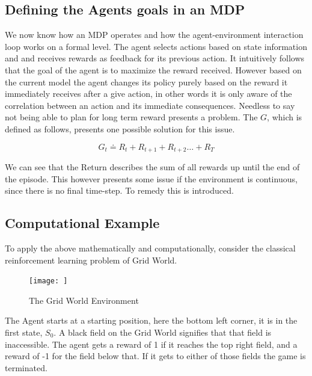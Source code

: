 \subsection{Defining the Agents goals in an MDP}\label{subsec:goals}

We now know how an MDP operates and how the agent-environment interaction loop works on a formal level. The agent selects actions based on state information and and receives rewards as feedback for its previous action. It intuitively follows that the goal of the agent is to maximize the reward received. However based on the current model the agent changes its policy purely based on the reward it immediately receives after a give action, in other words it is only aware of the correlation between an action and its immediate consequences. Needless to say not being able to plan for long term reward presents a problem. The  $G$, which is defined as follows, presents one possible solution for this issue.

\begin{equation}\label{MDP:return}
    G_t \doteq R_t + R_{t+1} + R_{t+2} \dots + R_T
\end{equation}
\centerline{\small{}}

We can see that the Return describes the sum of all rewards up until the end of the episode. This however presents some issue if the environment is continuous, since there is no final time-step. To remedy this  is introduced. 


\subsection*{Computational Example}\label{subsec:grid_world}

To apply the above mathematically and computationally, consider the classical reinforcement learning problem of Grid World. 

\begin{figure}[h!]
    \centering
    \texttt{[image: ]}
    \caption{The Grid World Environment}
    \label{fig:grid_world}
\end{figure}

The Agent starts at a starting position, here the bottom left corner, it is in the first state, $S_0$. A black field on the Grid World signifies that that field is inaccessible. The agent gets a reward of 1 if it reaches the top right field, and a reward of -1 for the field below that. If it gets to either of those fields the game is terminated. 